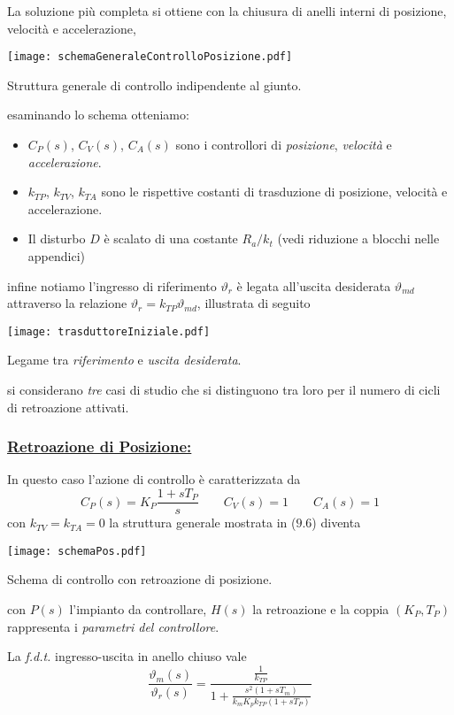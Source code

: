 La soluzione più completa si ottiene con la chiusura di anelli interni di posizione, velocità e accelerazione,
\begin{center}
	\texttt{[image: schemaGeneraleControlloPosizione.pdf]}
	\caption{Struttura generale di controllo indipendente al giunto.}
\end{center}
esaminando lo schema otteniamo:
\begin{itemize}
	\item $C_{P}(s)$, $C_{V}(s)$, $C_{A}(s)$ sono i controllori di \emph{posizione}, \emph{velocità} e \emph{accelerazione}.
	\item $k_{TP}$, $k_{TV}$, $k_{TA}$ sono le rispettive costanti di trasduzione di posizione, velocità e accelerazione.
	\item Il disturbo $D$ è scalato di una costante $R_a/k_t$ (vedi riduzione a blocchi nelle appendici)
\end{itemize} 
infine notiamo l'ingresso di riferimento $\vartheta_r$ è legata all'uscita desiderata $\vartheta_{md}$ attraverso la relazione $\vartheta_r = k_{TP} \vartheta_{md}$, illustrata di seguito
\begin{center}
	\texttt{[image: trasduttoreIniziale.pdf]}
	\caption{Legame tra \emph{riferimento} e \emph{uscita desiderata}.}
\end{center}
si considerano \emph{tre} casi di studio che si distinguono tra loro per il numero di cicli di retroazione attivati.

\subsubsection{\underline{Retroazione di Posizione:}}
In questo caso l'azione di controllo è caratterizzata da 
\begin{equation*}
	C_P(s) = K_P \frac{1+sT_P}{s} \qquad C_V(s) = 1 \qquad C_A(s) = 1 
\end{equation*}
con $k_{TV} = k_{TA} = 0$ la struttura generale mostrata in ($9.6$) diventa
\begin{center}
	\texttt{[image: schemaPos.pdf]}
	\caption{Schema di controllo con retroazione di posizione.}
\end{center}
con $P(s)$ l'impianto da controllare, $H(s)$ la retroazione e la coppia $(K_P, T_P)$ rappresenta i \emph{parametri del controllore}.

La \emph{f.d.t.} ingresso-uscita in anello chiuso vale
\begin{equation}
	\frac{\vartheta_m(s)}{\vartheta_r(s)} = \frac{\frac{1}{k_{TP}}}{1+\frac{s^2(1+sT_m)}{k_mK_pk_{TP}(1+sT_P)}}
\end{equation}

